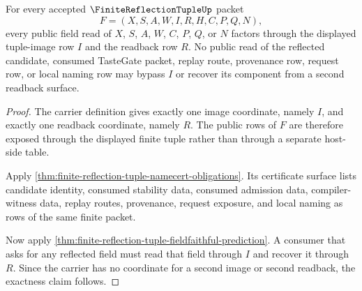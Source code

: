 \begin{theorem}
\label{thm:finite-reflection-tuple-image-readback-exactness}
For every accepted $\FiniteReflectionTupleUp$ packet
$$
F=(X,S,A,W,I,R,H,C,P,Q,N),
$$
every public field read of $X$, $S$, $A$, $W$, $C$, $P$, $Q$, or $N$ factors through the displayed tuple-image row $I$ and the readback row $R$. No public read of the reflected candidate, consumed TasteGate packet, replay route, provenance row, request row, or local naming row may bypass $I$ or recover its component from a second readback surface.
\end{theorem}
\begin{proof}
The carrier definition gives exactly one image coordinate, namely $I$, and exactly one readback coordinate, namely $R$. The public rows of $F$ are therefore exposed through the displayed finite tuple rather than through a separate host-side table.

Apply \autoref{thm:finite-reflection-tuple-namecert-obligations}. Its certificate surface lists candidate identity, consumed stability data, consumed admission data, compiler-witness data, replay routes, provenance, request exposure, and local naming as rows of the same finite packet.

Now apply \autoref{thm:finite-reflection-tuple-fieldfaithful-prediction}. A consumer that asks for any reflected field must read that field through $I$ and recover it through $R$. Since the carrier has no coordinate for a second image or second readback, the exactness claim follows.
\end{proof}

